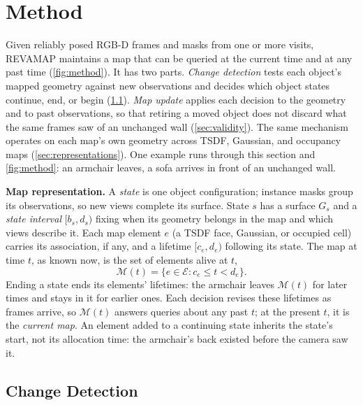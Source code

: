\documentclass[10pt,twocolumn,letterpaper]{article}
\newcommand{\ours}{REVAMAP\xspace}
\begin{document}
\section{Method}
\label{sec:method}

Given reliably posed RGB-D frames and masks from one or more visits, \ours maintains a map that can be queried at the current time and at any past time (\cref{fig:method}). It has two parts. \emph{Change
detection} tests each object's mapped geometry against new observations and decides which object states continue, end, or begin (\cref{sec:states}). \emph{Map update} applies each decision to the geometry and to past observations, so that retiring a moved object does not discard what the same frames saw of an unchanged wall (\cref{sec:validity}). The same mechanism operates on each map's own geometry across TSDF, Gaussian, and occupancy maps (\cref{sec:representations}). One example runs through this section and \cref{fig:method}: an armchair leaves, a sofa arrives in front of an unchanged wall.

\vspace{0mm}\noindent\textbf{Map representation.}\label{sec:setting}
A \emph{state} is one object configuration; instance masks group its observations, so new views complete its
surface. State $s$ has a surface $G_s$ and a \emph{state interval} $[b_s,d_s)$ fixing when its geometry belongs in the
map and which views describe it. Each map element $e$ (a TSDF face, Gaussian, or occupied cell) carries its association, if any, and a lifetime $[c_e,d_e)$ following its state. The map at time $t$, as known now, is the set of elements alive
at $t$,
\begin{equation}
  \mathcal{M}(t)=\{e\in\mathcal{E}:c_e\leq t<d_e\}.
  \label{eq:map_at_t}
\end{equation}
Ending a state ends its elements' lifetimes: the armchair leaves $\mathcal{M}(t)$ for later times and stays
in it for earlier ones. Each decision revises these lifetimes as frames arrive, so $\mathcal{M}(t)$ answers queries about any past $t$; at the present $t$, it is the \emph{current map}. An element added to a continuing state inherits the state's start, not its allocation time: the armchair's back existed before the camera saw it.

\subsection{Change Detection}
\label{sec:states}
\end{document}
